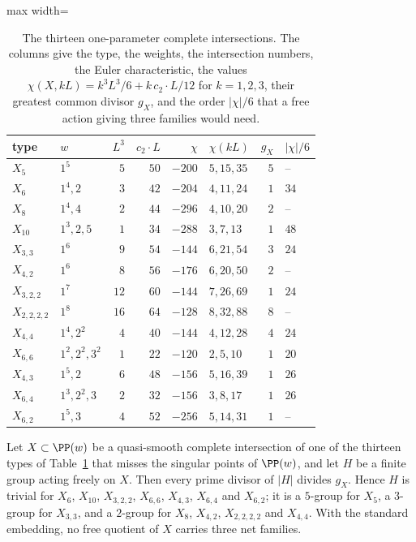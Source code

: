 \begin{table}[t]
\caption{The thirteen one-parameter complete intersections. The columns
give the type, the weights, the intersection numbers, the Euler
characteristic, the values $\chi(X,kL)=k^3L^3/6+k\,c_2\cdot L/12$ for
$k=1,2,3$, their greatest common divisor $g_X$, and the order $|\chi|/6$
that a free action giving three families would need.}
\label{tab:freequot}
\centering
\begin{adjustbox}{max width=\linewidth}\begin{tabular}{llrrrlrl}
\toprule
type & $w$ & $L^3$ & $c_2\cdot L$ & $\chi$ & $\chi(kL)$ & $g_X$ & $|\chi|/6$\\
\midrule
$X_5$ & $1^5$ & $5$ & $50$ & $-200$ & $5,15,35$ & $5$ & --\\
$X_6$ & $1^4,2$ & $3$ & $42$ & $-204$ & $4,11,24$ & $1$ & $34$\\
$X_8$ & $1^4,4$ & $2$ & $44$ & $-296$ & $4,10,20$ & $2$ & --\\
$X_{10}$ & $1^3,2,5$ & $1$ & $34$ & $-288$ & $3,7,13$ & $1$ & $48$\\
$X_{3,3}$ & $1^6$ & $9$ & $54$ & $-144$ & $6,21,54$ & $3$ & $24$\\
$X_{4,2}$ & $1^6$ & $8$ & $56$ & $-176$ & $6,20,50$ & $2$ & --\\
$X_{3,2,2}$ & $1^7$ & $12$ & $60$ & $-144$ & $7,26,69$ & $1$ & $24$\\
$X_{2,2,2,2}$ & $1^8$ & $16$ & $64$ & $-128$ & $8,32,88$ & $8$ & --\\
$X_{4,4}$ & $1^4,2^2$ & $4$ & $40$ & $-144$ & $4,12,28$ & $4$ & $24$\\
$X_{6,6}$ & $1^2,2^2,3^2$ & $1$ & $22$ & $-120$ & $2,5,10$ & $1$ & $20$\\
$X_{4,3}$ & $1^5,2$ & $6$ & $48$ & $-156$ & $5,16,39$ & $1$ & $26$\\
$X_{6,4}$ & $1^3,2^2,3$ & $2$ & $32$ & $-156$ & $3,8,17$ & $1$ & $26$\\
$X_{6,2}$ & $1^5,3$ & $4$ & $52$ & $-256$ & $5,14,31$ & $1$ & --\\
\bottomrule
\end{tabular}\end{adjustbox}
\end{table}

\begin{proposition}\label{prop:freequot}
Let $X\subset\PP(w)$ be a quasi-smooth complete intersection of one of the
thirteen types of Table~\ref{tab:freequot} that misses the singular points
of $\PP(w)$, and let $H$ be a finite group acting freely on $X$. Then every
prime divisor of $|H|$ divides $g_X$. Hence $H$ is trivial for $X_6$,
$X_{10}$, $X_{3,2,2}$, $X_{6,6}$, $X_{4,3}$, $X_{6,4}$ and $X_{6,2}$; it is
a $5$-group for $X_5$, a $3$-group for $X_{3,3}$, and a $2$-group for
$X_8$, $X_{4,2}$, $X_{2,2,2,2}$ and $X_{4,4}$. With the standard embedding,
no free quotient of $X$ carries three net families.
\end{proposition}

